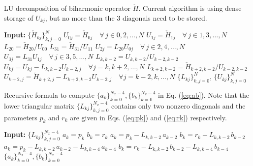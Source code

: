 \documentclass[11pt, oneside]{article}
\newcommand{\N}[1]{\check{#1}}
\begin{document}
\begin{algorithm}
	\caption{LU decomposition of biharmonic operator $\N{H}$. Current algorithm 
	is using dense storage of $U_{kj}$, but no more than the 3 diagonals need 
	to be stored.}
	\label{alg:lu_biharmonic}
	\begin{algorithmic}[1]
			\State \textbf{Input:} $\{\N{H}_{kj}\}_{k, j = 0}^{N}$
	        \State $U_{0j} = \N{H}_{0j} \quad \forall \, j \in 0, 2, \ldots, N$
	        \State $U_{1j} = \N{H}_{1j} \quad \forall \, j \in 1, 3, \ldots, N$
	        \State $L_{20} = \N{H}_{20}/U_{00}$
	        \State $L_{31} = \N{H}_{31}/U_{11}$
	        \State $U_{2j} = L_{20} U_{0j} \quad \forall \, j \in 2, 4, \ldots, 
	        N$
	        \State $U_{3j} = L_{31} U_{1j} \quad \forall \, j \in 3, 5, \ldots, 
	        N$
	            \State $L_{k,k-2} = {U}_{k,k-2}/{U}_{k-2, k-2}$
		        \State $U_{kj} = {U}_{kj} - L_{k, k-2} U_{k-2, j} \quad 
		        \forall j = k, k+2, \ldots, N$
		        \State $L_{k+2,k-2} = \N{H}_{k+2, k-2} / U_{k-2, k-2}$
		        \State $U_{k+2,j} = \N{H}_{k+2,j} - L_{k+2, k-2} U_{k-2, j} 
		        \quad \forall j = k-2, k, \ldots, N$
		        \EndIf
	        \EndFor
	        \State \Return $\{L_{kj}\}_{k, j = 0}^{N}$, $\{U_{kj}\}_{k, j = 
	        0}^{N}$
		\EndProcedure	
	\end{algorithmic}
\end{algorithm}		

\begin{algorithm}
	\caption{Recursive formula to compute $\{a_k\}_{k=0}^{N_x-4}, 
	\{b_k\}_{k=0}^{N_x-4}$ in Eq. (\ref{eq:ab}). Note that the lower triangular 
	matrix $\{L_{kj}\}_{k,j=0}^{N_x-4}$ contains only two nonzero diagonals and 
	the parameters $p_k$ and $r_k$ are given in Eqs. (\ref{eq:pk}) and 
	(\ref{eq:rk}) respectively. }
    \label{alg:ab}
	\begin{algorithmic}[1]
		\State \textbf{Input:} $ \{L_{kj}\}_{k,j=0}^{N_x-4}$
		     \State $a_k = p_k$
		     \State $b_k = r_k$
		\EndFor
		    \State $a_k = p_k - L_{k,k-2}\,a_{k-2}$
		    \State $b_k = r_k - L_{k, k-2}\,b_{k-2}$
		\EndFor
     		\State $a_k = p_k - L_{k,k-2}\,a_{k-2} - L_{k, k-4} \,a_{k-4}$
	    	\State $b_k = r_k - L_{k, k-2}\,b_{k-2}- L_{k, k-4} \,b_{k-4}$
		\EndFor
		\State \Return $\{a_k\}_{k=0}^{N_x-4}, \{b_k\}_{k=0}^{N_x-4}$
        \EndProcedure
\end{algorithmic}
\end{algorithm}
\end{document}
